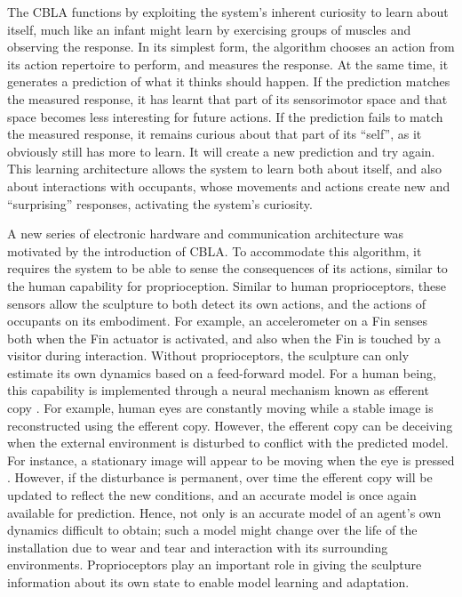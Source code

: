The CBLA functions by exploiting the system's inherent curiosity to learn about itself, much like an infant might learn by exercising groups of muscles and observing the response. In its simplest form, the algorithm chooses an action from its action repertoire to perform, and measures the response. At the same time, it generates a prediction of what it thinks should happen. If the prediction matches the measured response, it has learnt that part of its sensorimotor space and that space becomes less interesting for future actions. If the prediction fails to match the measured response, it remains curious about that part of its ``self'', as it obviously still has more to learn. It will create a new prediction and try again.  This learning architecture allows the system to learn both about itself, and also about interactions with occupants, whose movements and actions create new and ``surprising'' responses, activating the system's curiosity.

A new series of electronic hardware and communication architecture was motivated by the introduction of CBLA. To accommodate this algorithm, it requires the system to be able to sense the consequences of its actions, similar to the human capability for proprioception. Similar to human proprioceptors, these sensors allow the sculpture to both detect its own actions, and the actions of occupants on its embodiment. For example, an accelerometer on a Fin senses both when the Fin actuator is activated, and also when the Fin is touched by a visitor during interaction. Without proprioceptors, the sculpture can only estimate its own dynamics based on a feed-forward model. For a human being, this capability is implemented through a neural mechanism known as efferent copy \cite{Arbib2003}. For example, human eyes are constantly moving while a stable image is reconstructed using the efferent copy. However, the efferent copy can be deceiving when the external environment is disturbed to conflict with the predicted model. For instance, a stationary image will appear to be moving when the eye is pressed \cite{Bridgeman2007}.  However, if the disturbance is permanent, over time the efferent copy will be updated to reflect the new conditions, and an accurate model is once again available for prediction. Hence, not only is an accurate model of an agent's own dynamics difficult to obtain; such a model might change over the life of the installation due to wear and tear and interaction with its surrounding environments. Proprioceptors play an important role in giving the sculpture information about its own state to enable model learning and adaptation. 


